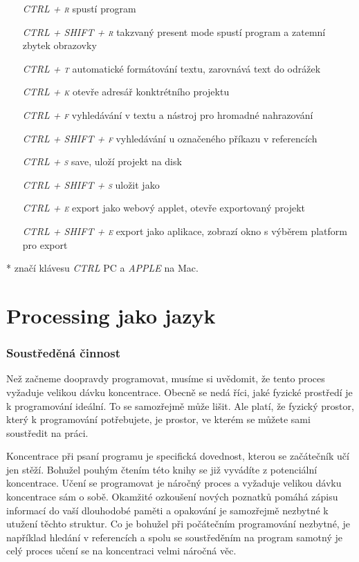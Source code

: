 \documentclass[10pt]{book}
\newcommand{\oddil}[1]{\section{#1}\index{#1}\label{#1}}
\newcommand{\klavesy}[1]{\textsc{\em #1}}
\begin{document}
\begin{itemize}
\item[\klavesy{CTRL + r}]  spustí program
\item[\klavesy{CTRL + SHIFT + r}] takzvaný present mode spustí program a zatemní zbytek obrazovky
\item[\klavesy{CTRL + t}] automatické formátování textu, zarovnává text do odrážek
\item[\klavesy{CTRL + k}] otevře adresář konktrétního projektu
\item[\klavesy{CTRL + f}] vyhledávání v textu a nástroj pro hromadné nahrazování
\item[\klavesy{CTRL + SHIFT + f}] vyhledávání u označeného příkazu v referencích
\item[\klavesy{CTRL + s}] save, uloží projekt na disk
\item[\klavesy{CTRL + SHIFT + s}] uložit jako

\item[\klavesy{CTRL + e}] export jako webový applet, otevře exportovaný projekt
\item[\klavesy{CTRL + SHIFT + e}] export jako aplikace, zobrazí okno s výběrem platform pro export

\end{itemize}

* značí klávesu \klavesy{CTRL} PC a \klavesy{APPLE} na Mac.


\part{Processing jako jazyk}

\oddil{Soustředěná činnost}

Než začneme doopravdy programovat, musíme si uvědomit, že tento proces vyžaduje velikou dávku koncentrace. Obecně se nedá říci, jaké fyzické prostředí je k programování ideální. To se samozřejmě může lišit. Ale platí, že fyzický prostor, který k programování potřebujete, je prostor, ve kterém se můžete sami soustředit na práci.

Koncentrace při psaní programu je specifická dovednost, kterou se začátečník učí jen stěží. Bohužel pouhým čtením této knihy se již vyvádíte z potenciální koncentrace. Učení se programovat je náročný proces a vyžaduje velikou dávku koncentrace sám o sobě. Okamžité ozkoušení nových poznatků pomáhá zápisu informací do vaší dlouhodobé paměti a opakování je samozřejmě nezbytné k utužení těchto struktur. Co je bohužel při počátečním programování nezbytné, je například hledání v referencích a spolu se soustředěním na program samotný je celý proces učení se na koncentraci velmi náročná věc.
\end{document}
